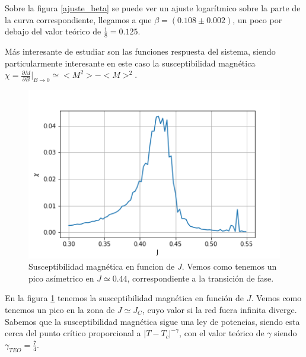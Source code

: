 \documentclass[
 reprint,
 amsmath,amssymb,
 aps,
]{revtex4-1}
\begin{document}
Sobre la figura \ref{ajuste_beta} se puede ver un ajuste logar\'itmico sobre la
parte de la curva correspondiente, llegamos a que $\beta = (0.108 \pm 0.002)$,
un poco por debajo del valor te\'orico de $\frac{1}{8} = 0.125$.

M\'as interesante de estudiar son las funciones respuesta del sistema, siendo
particularmente interesante en este caso la susceptibilidad magn\'etica $\chi =
\frac{\partial M}{\partial B}|_{B \rightarrow 0} \simeq <M^2> - <M>^2$.

\begin{figure}
  \includegraphics[width=1.0\columnwidth]{images/chi_vs_j.png}
  \caption{Susceptibilidad magn\'etica en funcion de $J$. Vemos como tenemos un
  pico as\'imetrico en $J \simeq 0.44$, correspondiente a la transici\'on de
  fase.}
  \label{chi_vs_j}
\end{figure}

En la figura \ref{chi_vs_j} tenemos la susceptibilidad magn\'etica en funci\'on
de $J$. Vemos como tenemos un pico en la zona de $J \simeq J_C$, cuyo valor si
la red fuera infinita diverge. Sabemos que la susceptibilidad magn\'etica sigue
una ley de potencias, siendo esta cerca del punto cr\'itico proporcional a $|T -
T_c|^{-\gamma}$, con el valor te\'orico de $\gamma$ siendo $\gamma_{TEO} =
\frac{7}{4}$.
\end{document}
